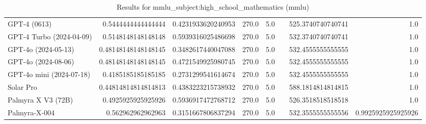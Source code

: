 \begin{table}[htp]
{\begin{tabular}{lrrrrrrr}
GPT-4 (0613) & 0.5444444444444444 & 0.4231933620240953 & 270.0 & 5.0 &  & 525.3740740740741 & 1.0 \\
GPT-4 Turbo (2024-04-09) & 0.5148148148148148 & 0.5939316025486698 & 270.0 & 5.0 &  & 532.3740740740741 & 1.0 \\
GPT-4o (2024-05-13) & 0.48148148148148145 & 0.3482617440047088 & 270.0 & 5.0 &  & 532.4555555555555 & 1.0 \\
GPT-4o (2024-08-06) & 0.48148148148148145 & 0.4721549925980745 & 270.0 & 5.0 &  & 532.4555555555555 & 1.0 \\
GPT-4o mini (2024-07-18) & 0.4185185185185185 & 0.2731299541614674 & 270.0 & 5.0 &  & 532.4555555555555 & 1.0 \\
Solar Pro & 0.44814814814814813 & 0.4383223215738932 & 270.0 & 5.0 &  & 588.1814814814815 & 1.0 \\
Palmyra X V3 (72B) & 0.4925925925925926 & 0.5936917472768712 & 270.0 & 5.0 &  & 526.3518518518518 & 1.0 \\
Palmyra-X-004 & 0.562962962962963 & 0.3151667806837294 & 270.0 & 5.0 &  & 532.3555555555556 & 0.9925925925925926 \\
\bottomrule
\end{tabular}}
\caption{Results for mmlu_subject:high_school_mathematics (mmlu)}
\label{fig:mmlu_subject:high_school_mathematics (mmlu)}
\end{table}